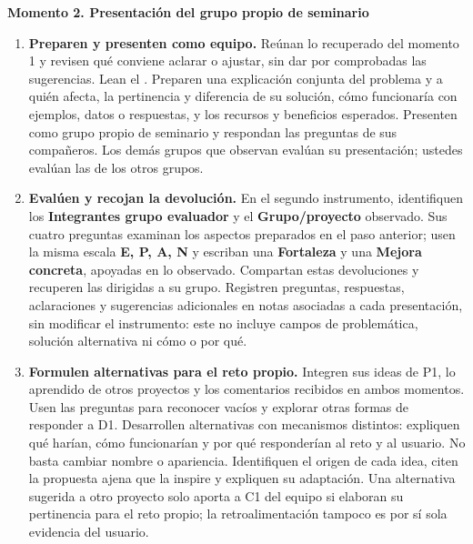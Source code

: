 \newpage
\textbf{Momento 2. Presentación del grupo propio de seminario}
\begin{enumerate}[resume=pasos]
\item \textbf{Preparen y presenten como equipo.} Reúnan lo recuperado del momento 1 y revisen qué conviene aclarar o ajustar, sin dar por comprobadas las sugerencias. Lean el . Preparen una explicación conjunta del problema y a quién afecta, la pertinencia y diferencia de su solución, cómo funcionaría con ejemplos, datos o respuestas, y los recursos y beneficios esperados. Presenten como grupo propio de seminario y respondan las preguntas de sus compañeros. Los demás grupos que observan evalúan su presentación; ustedes evalúan las de los otros grupos.
\item \textbf{Evalúen y recojan la devolución.} En el segundo instrumento, identifiquen los \textbf{Integrantes grupo evaluador} y el \textbf{Grupo/proyecto} observado. Sus cuatro preguntas examinan los aspectos preparados en el paso anterior; usen la misma escala \textbf{E, P, A, N} y escriban una \textbf{Fortaleza} y una \textbf{Mejora concreta}, apoyadas en lo observado. Compartan estas devoluciones y recuperen las dirigidas a su grupo. Registren preguntas, respuestas, aclaraciones y sugerencias adicionales en notas asociadas a cada presentación, sin modificar el instrumento: este no incluye campos de problemática, solución alternativa ni cómo o por qué.
\item \textbf{Formulen alternativas para el reto propio.} Integren sus ideas de P1, lo aprendido de otros proyectos y los comentarios recibidos en ambos momentos. Usen las preguntas para reconocer vacíos y explorar otras formas de responder a D1. Desarrollen alternativas con mecanismos distintos: expliquen qué harían, cómo funcionarían y por qué responderían al reto y al usuario. No basta cambiar nombre o apariencia. Identifiquen el origen de cada idea, citen la propuesta ajena que la inspire y expliquen su adaptación. Una alternativa sugerida a otro proyecto solo aporta a C1 del equipo si elaboran su pertinencia para el reto propio; la retroalimentación tampoco es por sí sola evidencia del usuario.
\end{enumerate}

